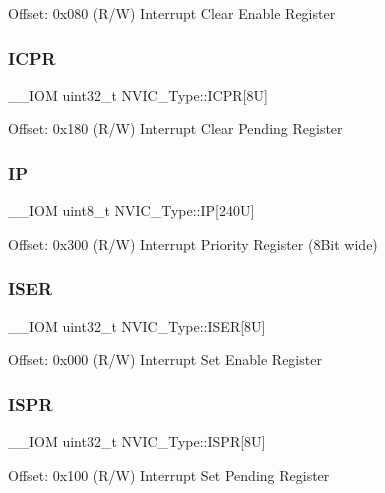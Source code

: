 Offset\+: 0x080 (R/W) Interrupt Clear Enable Register \mbox{\label{structNVIC__Type_ae3c409719774e839b092bf3ea73c0545}} 
\subsubsection{\texorpdfstring{ICPR}{ICPR}}
{\footnotesize\ttfamily \+\_\+\+\_\+\+I\+OM uint32\+\_\+t N\+V\+I\+C\+\_\+\+Type\+::\+I\+C\+PR\mbox{[}8\+U\mbox{]}}

Offset\+: 0x180 (R/W) Interrupt Clear Pending Register \mbox{\label{structNVIC__Type_a9a4341692e45d089a113986a3d344e98}} 
\subsubsection{\texorpdfstring{IP}{IP}}
{\footnotesize\ttfamily \+\_\+\+\_\+\+I\+OM uint8\+\_\+t N\+V\+I\+C\+\_\+\+Type\+::\+IP\mbox{[}240\+U\mbox{]}}

Offset\+: 0x300 (R/W) Interrupt Priority Register (8Bit wide) \mbox{\label{structNVIC__Type_a99fe3791941bf69b7c1edf13e0b5383a}} 
\subsubsection{\texorpdfstring{ISER}{ISER}}
{\footnotesize\ttfamily \+\_\+\+\_\+\+I\+OM uint32\+\_\+t N\+V\+I\+C\+\_\+\+Type\+::\+I\+S\+ER\mbox{[}8\+U\mbox{]}}

Offset\+: 0x000 (R/W) Interrupt Set Enable Register \mbox{\label{structNVIC__Type_a58a1d427f4f45aa4bba77115ec25a2f9}} 
\subsubsection{\texorpdfstring{ISPR}{ISPR}}
{\footnotesize\ttfamily \+\_\+\+\_\+\+I\+OM uint32\+\_\+t N\+V\+I\+C\+\_\+\+Type\+::\+I\+S\+PR\mbox{[}8\+U\mbox{]}}

Offset\+: 0x100 (R/W) Interrupt Set Pending Register \mbox{\label{structNVIC__Type_a37de89637466e007171c6b135299bc75}} 
